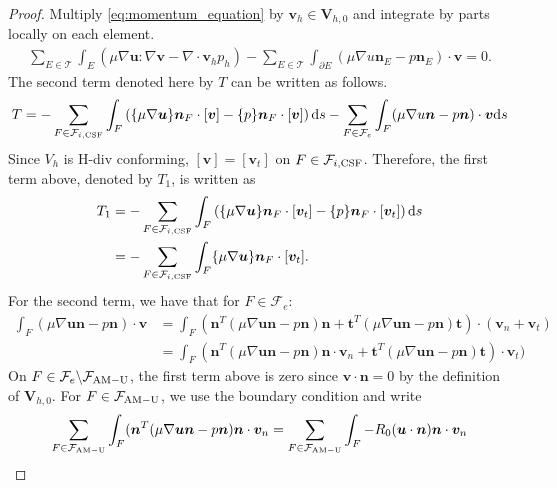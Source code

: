 \documentclass[11pt, dvipsnames]{amsart}
\begin{document}
\begin{proof}
 Multiply \eqref{eq:momentum_equation} by $\bm v_h \in \bm V_{h,0}$ and integrate by parts locally on each element. 
 \begin{align}
     \sum_{E \in \mathcal{T}} \int_E  (\mu \nabla \bm u : \nabla \bm v - \nabla \cdot \bm v_h p_h ) -  \sum_{E \in \mathcal{T}}  \int_{\partial E}  ( \mu \nabla u \bm n_E  - p \bm n_E) \cdot \bm v  = 0. 
  \end{align} 
The second term denoted here by $T$  can be written as follows.
\begin{align} \nonumber
T = -\sum_{F \in  \mathcal{F}_{i, \rm CSF}}  \int_{F}  \left( \{ \mu \nabla \bm u\} \bm n_F \cdot [\bm v]  -  \{ p \} \bm n_F \cdot [\bm v]  \right) \mathrm{d}s   -  \sum_{F \in \mathcal{F}_e}   \int_{F} ( \mu \nabla u \bm n   - p \bm n) \cdot \bm v \mathrm{d}s
\end{align}
Since $V_h $ is H-div conforming, $[\bm v ] = [\bm v_t] $ on $F \in \mathcal{F}_{i,\rm CSF}$. Therefore, the first term above, denoted by $T_1$, is written as 
\begin{align}
T_1 & = -  \sum_{F \in  \mathcal{F}_{i, \rm CSF}}  \int_{F}  \left( \{ \mu \nabla \bm u\} \bm n_F \cdot [\bm v_t]  -  \{ p \} \bm n_F \cdot [\bm v_t]  \right) \mathrm{d}s  \\ 
& = - \sum_{F \in  \mathcal{F}_{i, \rm CSF}}  \int_{F}  \{ \mu \nabla \bm u\} \bm n_F \cdot [\bm v_t].  \nonumber 
\end{align}
For the second term, we have that for $F \in \mathcal{F}_e$: 
\begin{align*}
\int_F (\mu \nabla \bm u \bm n - p \bm n) \cdot \bm v & = \int_F (\bm n^T (\mu \nabla \bm u \bm n - p \bm n)\bm n  +\bm t^T (\mu \nabla \bm u \bm n - p \bm n)\bm t ) \cdot (\bm v_n + \bm v_t) \\ 
&  = \int_F (\bm n^T (\mu \nabla \bm u \bm n - p \bm n)\bm n \cdot \bm v_n   +\bm t^T (\mu \nabla \bm u \bm n - p \bm n)\bm t ) \cdot  \bm v_t)
\end{align*}
 On $F \in \mathcal{F}_e \backslash \mathcal{F}_{\rm{AM-U}}$, the first term above is zero since $\bm v \cdot \bm n = 0 $ by the definition of $\bm V_{h,0}$.  For $F \in \mathcal{F}_{\rm{AM-U}}$, we use the boundary condition and write 
 \begin{align}
     \sum_{F \in \mathcal{F}_{\rm{AM-U}}} \int_F (\bm n^T (\mu \nabla \bm u \bm n - p \bm n)\bm n \cdot \bm v_n   &  = \sum_{F \in \mathcal{F}_{\rm{AM-U}}} \int_F - R_0 (\bm u \cdot \bm n)  \bm n \cdot \bm v_n  \\ 

\end{align}
\end{proof}
\end{document}
